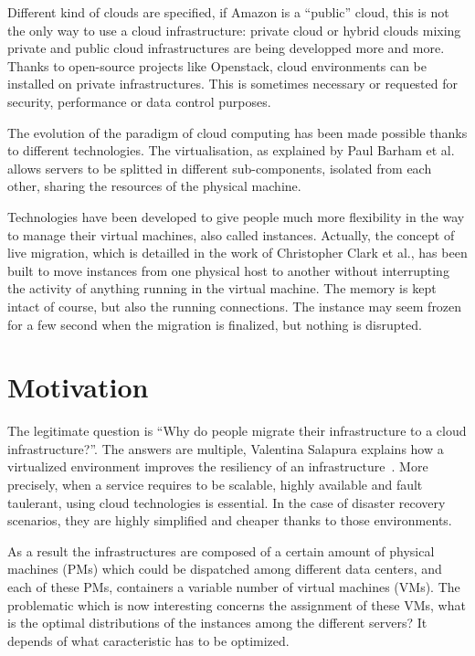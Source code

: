\documentclass[a4paper,11pt]{article}
\begin{document}
Different kind of clouds are specified, if Amazon is a “public” cloud, this is
not the only way to use a cloud infrastructure: private cloud or hybrid clouds
mixing private and public cloud infrastructures are being developped more and
more. Thanks to open-source projects like Openstack\cite{website:openstack},
cloud environments can be installed on private infrastructures. This is
sometimes necessary or requested for security, performance or data control
purposes.

The evolution of the paradigm of cloud computing has been made possible thanks
to different technologies. The virtualisation, as explained by Paul Barham et
al.\cite{virtualisation} allows servers to be splitted in different
sub-components, isolated from each other, sharing the resources of the physical
machine. 

Technologies have been developed to give people much more flexibility
in the way to manage their virtual machines, also called instances. Actually,
the concept of live migration, which is detailled in the work of Christopher
Clark et al.\cite{livemigration}, has been built to move instances from one
physical host to another without interrupting the activity of anything running
in the virtual machine. The memory is kept intact of course, but also the
running connections.  The instance may seem frozen for a few second when the
migration is finalized, but nothing is disrupted.

\section{Motivation}

The legitimate question is “Why do people migrate their infrastructure to a
cloud infrastructure?”. The answers are multiple, Valentina Salapura explains
how a virtualized environment improves the resiliency of an
infrastructure~\cite{virtresiliency}. More precisely, when a service requires
to be scalable, highly available and fault taulerant, using cloud technologies
is essential. In the case of disaster recovery scenarios, they are highly
simplified and cheaper thanks to those environments.

As a result the infrastructures are composed of a certain amount of physical
machines (PMs) which could be dispatched among different data centers, and each
of these PMs, containers a variable number of virtual machines (VMs). The
problematic which is now interesting concerns the assignment of these VMs, what
is the optimal distributions of the instances among the different servers? It
depends of what caracteristic has to be optimized.
\end{document}
